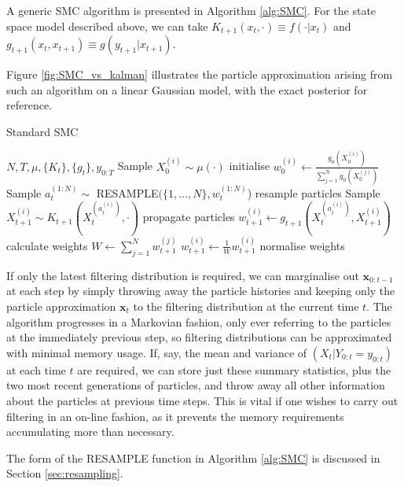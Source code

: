 \documentclass[fleqn]{article}
\theoremstyle{definition}
\newcommand{\wt}[2][t]{w_{#1}^{(#2)}}
\begin{document}
A generic SMC algorithm is presented in Algorithm \ref{alg:SMC}. For the state space model described above, we can take $K_{t+1}(x_t, \cdot) \equiv f(\cdot | x_t)$ and $g_{t+1}(x_t, x_{t+1}) \equiv g(y_{t+1} | x_{t+1})$.

Figure \ref{fig:SMC_vs_kalman} illustrates the particle approximation arising from such an algorithm on a linear Gaussian model, with the exact posterior for reference.

\begin{algorithm}
\caption{Standard SMC}\label{alg:SMC}
\begin{algorithmic}[1]
\Require $N, T, \mu, \{K_t\}, \{g_t\}, y_{0:T}$
	\State Sample $X_0^{(i)} \sim \mu(\cdot)$  \Comment initialise
	\State $w_0^{(i)} \gets \frac{g_0(X_0^{(i)})}{\sum_{j=1}^N g_0(X_0^{(j)})}$
\EndFor
{}
	\State Sample $a_t^{(1:N)} \sim $ {\footnotesize RESAMPLE}$(\{1,\dots ,N\}, \wt{1:N}$) \Comment resample particles
		\State Sample $X_{t+1}^{(i)} \sim K_{t+1}(X_t^{(a_t^{(i)})}, \cdot)$ \Comment propagate particles
		\State $w_{t+1}^{(i)} \gets g_{t+1}(X_t^{(a_t^{(i)})} , X_{t+1}^{(i)})$ \Comment calculate weights
	\EndFor
	\State $W \gets \sum_{j=1}^N w_{t+1}^{(j)}$
		\State $w_{t+1}^{(i)} \gets \frac{1}{W}w_{t+1}^{(i)}$ \Comment normalise weights
	\EndFor
\EndFor
\end{algorithmic}
\end{algorithm}

If only the latest filtering distribution is required, we can marginalise out $\mathbf{x}_{0:t-1}$ at each step by simply throwing away the particle histories and keeping only the particle approximation $\mathbf{x}_{t}$ to the filtering distribution at the current time $t$. 
The algorithm progresses in a Markovian fashion, only ever referring to the particles at the immediately previous step, so filtering distributions can be approximated with minimal memory usage. 
If, say, the mean and variance of $(X_{t} | Y_{0:t} = y_{0:t})$ at each time $t$ are required, we can store just these summary statistics, plus the two most recent generations of particles, and throw away all other information about the particles at previous time steps. This is vital if one wishes to carry out filtering in an on-line fashion, as it prevents the memory requirements accumulating more than necessary.

The form of the {\footnotesize RESAMPLE} function in Algorithm \ref{alg:SMC} is discussed in Section \ref{sec:resampling}.
\end{document}
